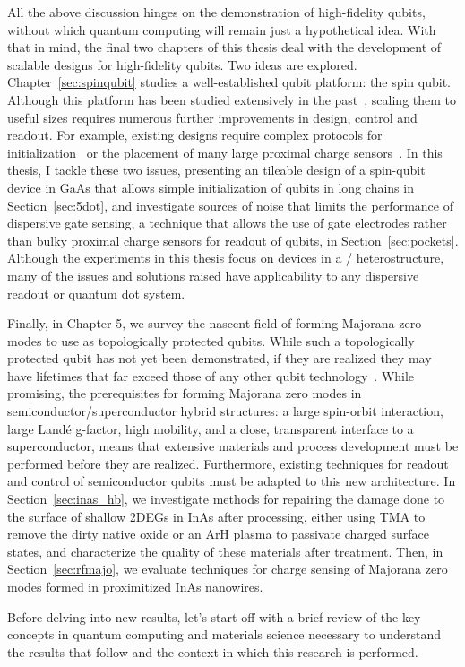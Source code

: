 All the above discussion hinges on the demonstration of high-fidelity qubits, without which quantum computing will remain just
a hypothetical idea. With that in mind, the final two chapters of this thesis deal with the development of scalable
designs for high-fidelity qubits. Two ideas are explored. Chapter~\ref{sec:spinqubit} studies a well-established qubit platform: the spin
qubit. Although this platform has been studied extensively in the past~\cite{RevModPhys.75.1,RevModPhys.79.1217}, scaling
them to useful sizes requires numerous further improvements in design, control and readout. For example, existing designs
require complex protocols for initialization~\cite{PhysRevApplied.6.054013} or the placement of many large proximal charge
sensors~\cite{s41467-019-09194-x}. In this thesis, I tackle these two issues, presenting an tileable design of a spin-qubit
device in GaAs that allows simple initialization of qubits in long chains in Section~\ref{sec:5dot}, and investigate sources
of noise that limits the performance of dispersive gate sensing, a technique that allows the use of gate electrodes rather
than bulky proximal charge sensors for readout of qubits, in Section~\ref{sec:pockets}. Although the experiments in this thesis
focus on devices in a / heterostructure, many of the issues and solutions raised have applicability to any
dispersive readout or quantum dot system.

Finally, in Chapter 5, we survey the nascent field of forming Majorana zero modes to use as topologically protected qubits. While
such a topologically protected qubit has not yet been demonstrated, if they are realized they may have lifetimes that far exceed those of
any other qubit technology~\cite{s41578-018-0003-1}. While promising, the prerequisites for forming Majorana zero modes in semiconductor/superconductor
hybrid structures: a large spin-orbit interaction, large Land\'e g-factor, high mobility, and a close, transparent interface to a superconductor, means that
extensive materials and process development must be performed before they are realized. Furthermore, existing techniques for readout and control of semiconductor
qubits must be adapted to this new architecture. In Section~\ref{sec:inas_hb}, we investigate methods for repairing the damage done to the surface of shallow
2DEGs in InAs after processing, either using TMA to remove the dirty native oxide or an ArH plasma to passivate charged surface states, and characterize
the quality of these materials after treatment. Then, in Section~\ref{sec:rfmajo}, we evaluate techniques for charge sensing of Majorana zero modes formed
in proximitized InAs nanowires.

Before delving into new results, let's start off with a brief review of the key concepts in quantum computing and materials science necessary
to understand the results that follow and the context in which this research is performed.